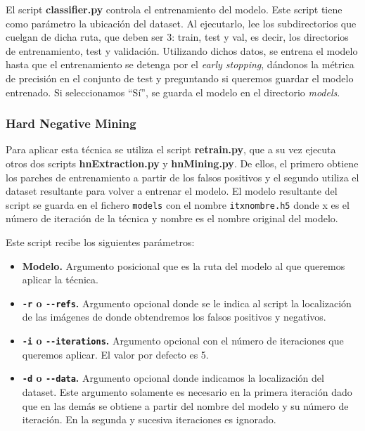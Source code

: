 El script \textbf{classifier.py} controla el entrenamiento del modelo. Este script tiene como parámetro la ubicación del dataset. Al ejecutarlo, lee los subdirectorios que cuelgan de dicha ruta, que deben ser 3: train, test y val, es decir, los directorios de entrenamiento, test y validación. Utilizando dichos datos, se entrena el modelo hasta que el entrenamiento se detenga por el \textit{early stopping}, dándonos la métrica de precisión en el conjunto de test y preguntando si queremos guardar el modelo entrenado. Si seleccionamos ``Sí'', se guarda el modelo en el directorio \textit{models}.

\subsubsection*{Hard Negative Mining}

Para aplicar esta técnica se utiliza el script \textbf{retrain.py}, que a su vez ejecuta otros dos scripts \textbf{hnExtraction.py} y \textbf{hnMining.py}. De ellos, el primero obtiene los parches de entrenamiento a partir de los falsos positivos y el segundo utiliza el dataset resultante para volver a entrenar el modelo. El modelo resultante del script se guarda en el fichero \texttt{models} con el nombre \texttt{itxnombre.h5} donde x es el número de iteración de la técnica y nombre es el nombre original del modelo.

Este script recibe los siguientes parámetros:

\begin{itemize}
  \item \textbf{Modelo.} Argumento posicional que es la ruta del modelo al que queremos aplicar la técnica.
  \item\textbf{\texttt{-r} o \texttt{-{}-refs}.} Argumento opcional donde se le indica al script la localización de las imágenes de donde obtendremos los falsos positivos y negativos.
  \item \textbf{\texttt{-i} o \texttt{-{}-iterations}.} Argumento opcional con el número de iteraciones que queremos aplicar. El valor por defecto es 5.
  \item \textbf{\texttt{-d} o \texttt{-{}-data}.} Argumento opcional donde indicamos la localización del dataset. Este argumento solamente es necesario en la primera iteración dado que en las demás se obtiene a partir del nombre del modelo y su número de iteración. En la segunda y sucesiva iteraciones es ignorado.
\end{itemize}

